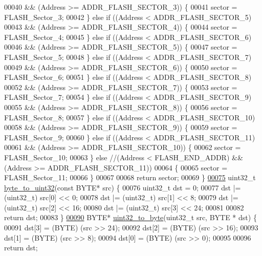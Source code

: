 \begin{DoxyCode}
00040       && (Address >= ADDR\_FLASH\_SECTOR\_3)) \{
00041     sector = FLASH\_Sector\_3;
00042   \} \textcolor{keywordflow}{else} \textcolor{keywordflow}{if} ((Address < ADDR\_FLASH\_SECTOR\_5)
00043       && (Address >= ADDR\_FLASH\_SECTOR\_4)) \{
00044     sector = FLASH\_Sector\_4;
00045   \} \textcolor{keywordflow}{else} \textcolor{keywordflow}{if} ((Address < ADDR\_FLASH\_SECTOR\_6)
00046       && (Address >= ADDR\_FLASH\_SECTOR\_5)) \{
00047     sector = FLASH\_Sector\_5;
00048   \} \textcolor{keywordflow}{else} \textcolor{keywordflow}{if} ((Address < ADDR\_FLASH\_SECTOR\_7)
00049       && (Address >= ADDR\_FLASH\_SECTOR\_6)) \{
00050     sector = FLASH\_Sector\_6;
00051   \} \textcolor{keywordflow}{else} \textcolor{keywordflow}{if} ((Address < ADDR\_FLASH\_SECTOR\_8)
00052       && (Address >= ADDR\_FLASH\_SECTOR\_7)) \{
00053     sector = FLASH\_Sector\_7;
00054   \} \textcolor{keywordflow}{else} \textcolor{keywordflow}{if} ((Address < ADDR\_FLASH\_SECTOR\_9)
00055       && (Address >= ADDR\_FLASH\_SECTOR\_8)) \{
00056     sector = FLASH\_Sector\_8;
00057   \} \textcolor{keywordflow}{else} \textcolor{keywordflow}{if} ((Address < ADDR\_FLASH\_SECTOR\_10)
00058       && (Address >= ADDR\_FLASH\_SECTOR\_9)) \{
00059     sector = FLASH\_Sector\_9;
00060   \} \textcolor{keywordflow}{else} \textcolor{keywordflow}{if} ((Address < ADDR\_FLASH\_SECTOR\_11)
00061       && (Address >= ADDR\_FLASH\_SECTOR\_10)) \{
00062     sector = FLASH\_Sector\_10;
00063   \} \textcolor{keywordflow}{else} \textcolor{comment}{//(Address < FLASH\_END\_ADDR) && (Address >= ADDR\_FLASH\_SECTOR\_11))}
00064   \{
00065     sector = FLASH\_Sector\_11;
00066   \}
00067 
00068   \textcolor{keywordflow}{return} sector;
00069 \}
\hypertarget{diskio_8c_source_l00075}{}\hyperlink{diskio_8c_a900718135e0cd4b363dddcdb44175607}{00075} uint32\_t \hyperlink{diskio_8c_a900718135e0cd4b363dddcdb44175607}{byte\_to\_uint32}(\textcolor{keyword}{const} BYTE* src) \{
00076   uint32\_t dst = 0;
00077   dst |= (uint32\_t) src[0] << 0;
00078   dst |= (uint32\_t) src[1] << 8;
00079   dst |= (uint32\_t) src[2] << 16;
00080   dst |= (uint32\_t) src[3] << 24;
00081 
00082   \textcolor{keywordflow}{return} dst;
00083 \}
\hypertarget{diskio_8c_source_l00090}{}\hyperlink{diskio_8c_ae214680b2ed5e6b6f4785c517f73c5b3}{00090} BYTE* \hyperlink{diskio_8c_ae214680b2ed5e6b6f4785c517f73c5b3}{uint32\_to\_byte}(uint32\_t src, BYTE * dst) \{
00091   dst[3] = (BYTE) (src >> 24);
00092   dst[2] = (BYTE) (src >> 16);
00093   dst[1] = (BYTE) (src >> 8);
00094   dst[0] = (BYTE) (src >> 0);
00095 
00096   \textcolor{keywordflow}{return} dst;

\end{DoxyCode}
